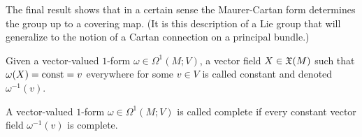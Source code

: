 The final result shows that in a certain sense the Maurer-Cartan form determines the group up to a covering map. (It is this description of a Lie group that will generalize to the notion of a Cartan connection on a principal bundle.)

\begin{defn}\label{def constant vector field}
    Given a vector-valued $1$-form $\omega\in\Omega^1(M;V)$, a vector field $X\in\mathfrak{X}(M)$ such that $\omega(X)=\mathrm{const}=v$ everywhere for some $v\in V$ is called constant and denoted $\omega^{-1}(v)$.
\end{defn}
\begin{defn}\label{def complete form}
    A vector-valued $1$-form $\omega\in\Omega^1(M;V)$ is called complete if every constant vector field $\omega^{-1}(v)$ is complete.
\end{defn}

